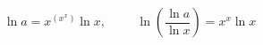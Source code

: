 \begin{displaymath}
\ln a = x^{\left( x^x\right) }\ln x, \hspace{1cm} \ln\left( \frac{\ln a }{\ln x }\right) = x^x\ln x    
\end{displaymath}

